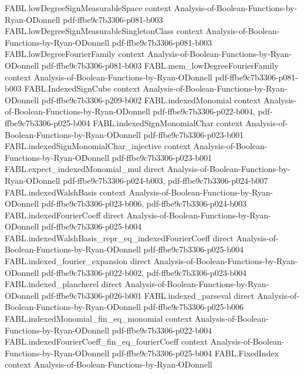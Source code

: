 \begin{theorem}
\proofstep
  {FABL.lowDegreeSignMeasurableSpace}
  {context}
  {Analysis-of-Boolean-Functions-by-Ryan-ODonnell}
  {pdf-ffbe9c7b3306-p081-b003}
\proofstep
  {FABL.lowDegreeSignMeasurableSingletonClass}
  {context}
  {Analysis-of-Boolean-Functions-by-Ryan-ODonnell}
  {pdf-ffbe9c7b3306-p081-b003}
\proofstep
  {FABL.lowDegreeFourierFamily}
  {context}
  {Analysis-of-Boolean-Functions-by-Ryan-ODonnell}
  {pdf-ffbe9c7b3306-p081-b003}
\proofstep
  {FABL.mem_lowDegreeFourierFamily}
  {context}
  {Analysis-of-Boolean-Functions-by-Ryan-ODonnell}
  {pdf-ffbe9c7b3306-p081-b003}
\proofstep
  {FABL.IndexedSignCube}
  {context}
  {Analysis-of-Boolean-Functions-by-Ryan-ODonnell}
  {pdf-ffbe9c7b3306-p209-b002}
\proofstep
  {FABL.indexedMonomial}
  {context}
  {Analysis-of-Boolean-Functions-by-Ryan-ODonnell}
  {pdf-ffbe9c7b3306-p022-b004,
    pdf-ffbe9c7b3306-p025-b004}
\proofstep
  {FABL.indexedSignMonomialChar}
  {context}
  {Analysis-of-Boolean-Functions-by-Ryan-ODonnell}
  {pdf-ffbe9c7b3306-p023-b001}
\proofstep
  {FABL.indexedSignMonomialChar_injective}
  {context}
  {Analysis-of-Boolean-Functions-by-Ryan-ODonnell}
  {pdf-ffbe9c7b3306-p023-b001}
\proofstep
  {FABL.expect_indexedMonomial_mul}
  {direct}
  {Analysis-of-Boolean-Functions-by-Ryan-ODonnell}
  {pdf-ffbe9c7b3306-p024-b003,
    pdf-ffbe9c7b3306-p024-b007}
\proofstep
  {FABL.indexedWalshBasis}
  {context}
  {Analysis-of-Boolean-Functions-by-Ryan-ODonnell}
  {pdf-ffbe9c7b3306-p023-b006,
    pdf-ffbe9c7b3306-p024-b003}
\proofstep
  {FABL.indexedFourierCoeff}
  {direct}
  {Analysis-of-Boolean-Functions-by-Ryan-ODonnell}
  {pdf-ffbe9c7b3306-p025-b004}
\proofstep
  {FABL.indexedWalshBasis_repr_eq_indexedFourierCoeff}
  {direct}
  {Analysis-of-Boolean-Functions-by-Ryan-ODonnell}
  {pdf-ffbe9c7b3306-p025-b004}
\proofstep
  {FABL.indexed_fourier_expansion}
  {direct}
  {Analysis-of-Boolean-Functions-by-Ryan-ODonnell}
  {pdf-ffbe9c7b3306-p022-b002,
    pdf-ffbe9c7b3306-p023-b004}
\proofstep
  {FABL.indexed_plancherel}
  {direct}
  {Analysis-of-Boolean-Functions-by-Ryan-ODonnell}
  {pdf-ffbe9c7b3306-p026-b001}
\proofstep
  {FABL.indexed_parseval}
  {direct}
  {Analysis-of-Boolean-Functions-by-Ryan-ODonnell}
  {pdf-ffbe9c7b3306-p025-b006}
\proofstep
  {FABL.indexedMonomial_fin_eq_monomial}
  {context}
  {Analysis-of-Boolean-Functions-by-Ryan-ODonnell}
  {pdf-ffbe9c7b3306-p022-b004}
\proofstep
  {FABL.indexedFourierCoeff_fin_eq_fourierCoeff}
  {context}
  {Analysis-of-Boolean-Functions-by-Ryan-ODonnell}
  {pdf-ffbe9c7b3306-p025-b004}
\proofstep
  {FABL.FixedIndex}
  {context}
  {Analysis-of-Boolean-Functions-by-Ryan-ODonnell}

\end{theorem}
